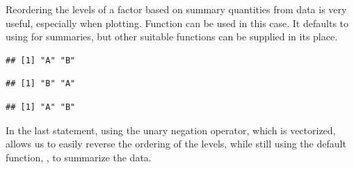 \documentclass[krantz2]{krantz}\usepackage{knitr}
\begin{document}
\begin{explainbox}
Reordering the levels of a factor based on summary quantities from data is very useful, especially when plotting. Function  can be used in this case. It defaults to using  for summaries, but other suitable functions can be supplied in its place.

\begin{knitrout}\footnotesize
{}\color{fgcolor}\begin{kframe}
\begin{alltt}
 \hlkwb{<-} \hlstd{(}\hlstd{,} \hlstd{,}  \hlstd{=} \hlstd{(}\hlstd{,} \hlstd{))}
 \hlkwb{<-} \hlstd{(}\hlstd{,} \hlstd{,} \hlstd{,} \hlstd{,} \hlstd{,} \hlstd{,} \hlstd{,} \hlstd{,} \hlstd{,} \hlstd{)}
\end{alltt}
\begin{verbatim}
## [1] "A" "B"
\end{verbatim}
\begin{alltt}
 \hlkwb{<-} 
\end{alltt}
\begin{verbatim}
## [1] "B" "A"
\end{verbatim}
\begin{alltt}
 \hlkwb{<-}  \hlopt{-} 
\end{alltt}
\begin{verbatim}
## [1] "A" "B"
\end{verbatim}
\end{kframe}
\end{knitrout}

In the last statement, using the unary negation operator, which is vectorized, allows us to easily reverse the ordering of the levels, while still using the default function, , to summarize the data.

\end{explainbox}
\end{document}
